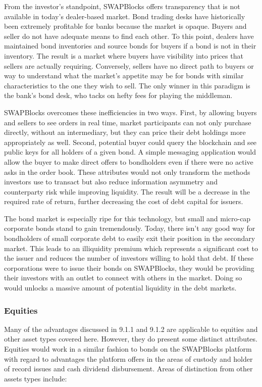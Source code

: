 \documentclass[12pt]{article}
\begin{document}
From the investor’s standpoint, SWAPBlocks offers transparency that is not available in today’s dealer-based market. 
Bond trading desks have historically been extremely profitable for banks because the market is opaque. Buyers and 
seller do not have adequate means to find each other. To this point, dealers have maintained bond inventories and 
source bonds for buyers if a bond is not in their inventory. The result is a market where buyers have visibility 
into prices that sellers are actually requiring. Conversely, sellers have no direct path to buyers or way to understand 
what the market’s appetite may be for bonds with similar characteristics to the one they wish to sell. The only 
winner in this paradigm is the bank’s bond desk, who tacks on hefty fees for playing the middleman. 

SWAPBlocks overcomes these inefficiencies in two ways. First, by allowing buyers and sellers to see orders in real time, 
market participants can not only purchase directly, without an intermediary, but they can price their debt holdings more 
appropriately as well. Second, potential buyer could query the blockchain and see public keys for all holders of a given bond. 
A simple messaging application would allow the buyer to make direct offers to bondholders even if there were no active asks in 
the order book. These attributes would not only transform the methods investors use to transact but also reduce information 
asymmetry and counterparty risk while improving liquidity. The result will be a decrease in the required rate of return, 
further decreasing the cost of debt capital for issuers.

The bond market is especially ripe for this technology, but small and micro-cap corporate bonds stand to gain 
tremendously. Today, there isn’t any good way for bondholders of small corporate debt to easily exit their position 
in the secondary market. This leads to an illiquidity premium which represents a significant cost to the issuer and 
reduces the number of investors willing to hold that debt. If these corporations were to issue their bonds on SWAPBlocks, 
they would be providing their investors with an outlet to connect with others in the market. Doing so would unlocks a 
massive amount of potential liquidity in the debt markets.

\subsubsection{Equities}
Many of the advantages discussed in 9.1.1 and 9.1.2 are applicable to equities and other asset types covered here. 
However, they do present some distinct attributes. Equities would work in a similar fashion to bonds on the SWAPBlocks 
platform with regard to advantages the platform offers in the areas of custody and holder of record issues and cash 
dividend disbursement. Areas of distinction from other assets types include:
\end{document}
